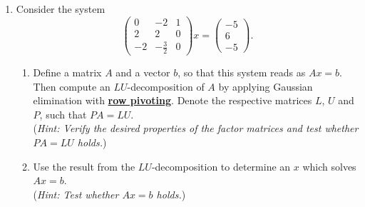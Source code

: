 \begin{enumerate}
\item Consider the system
$$
\begin{pmatrix}
0	&-2				& 1\\
2	&2				& 0\\
-2	&-\frac{3}{2}	&0
\end{pmatrix} x = 
\begin{pmatrix}
-5\\
6\\
-5
\end{pmatrix}.
$$
\begin{enumerate}
	\item  Define a matrix $A$ and a vector $b$, so that this system reads as $Ax = b$. Then compute an $LU$-decomposition of $A$ by applying Gaussian elimination with \underline{\textbf{row pivoting}}. Denote the respective matrices $L$, $U$ and $P$, such that $PA = LU$.\\
	(\textit{Hint: Verify the desired properties of the factor matrices and test whether  $PA = LU$ holds.})
	\item Use the result from the $LU$-decomposition to determine an $x$ which solves $Ax=b$.\\
	(\textit{Hint: Test whether $Ax=b$ holds.})
\end{enumerate}
\end{enumerate}
 